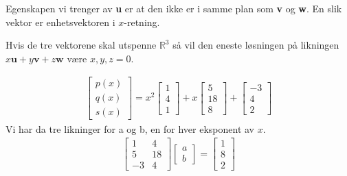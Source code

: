 \documentclass[11pt, a4paper, norsk]{NTNUoving}
\begin{document}
\begin{oppgave}
        Egenskapen vi trenger av \textbf{u} er at den ikke er i samme plan som \textbf{v} og \textbf{w}. En slik vektor er enhetsvektoren i $x$-retning.
        
        Hvis de tre vektorene skal utspenne $\mathbb{R}^3$ så vil den eneste løsningen på likningen $x\textbf{u}+y\textbf{v}+z\textbf{w}$ være $x, y, z=0$.
\end{oppgave}

\begin{oppgave}
    \begin{punkt}
        \begin{align*}
            \begin{bmatrix}
                p(x)\\
                q(x)\\
                s(x)
            \end{bmatrix}
            = x^2
            \begin{bmatrix}
                1\\
                4\\
                1
            \end{bmatrix}
            +x 
            \begin{bmatrix}
                5\\
                18\\
                8
            \end{bmatrix}
            +
            \begin{bmatrix}
                -3\\
                4\\
                2
            \end{bmatrix}
        \end{align*}
        Vi har da tre likninger for a og b, en for hver eksponent av $x$.
        \begin{align*}
            \begin{bmatrix}
                1 & 4 \\
                5 & 18\\
                -3 & 4
            \end{bmatrix}
            \begin{bmatrix}
                a \\
                b
            \end{bmatrix}
            =
            \begin{bmatrix}
                1 \\
                8\\
                2
            \end{bmatrix}
        \end{align*}
        

\end{punkt}
\end{oppgave}
\end{document}
